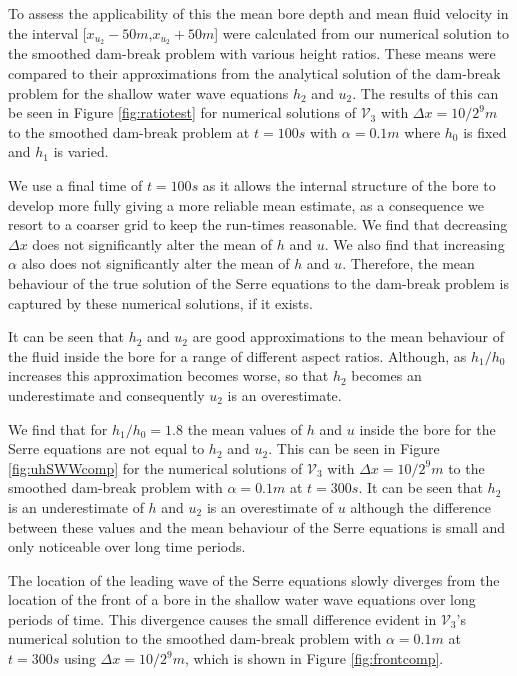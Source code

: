 \documentclass[times]{elsarticle}
\begin{document}
To assess the applicability of this the mean bore depth and mean fluid velocity in the interval [$x_{u_2}-50m$,$x_{u_2}+50m$] were calculated from our numerical solution to the smoothed dam-break problem with various height ratios. These means were compared to their approximations from the analytical solution of the dam-break problem for the shallow water wave equations $h_2$ and $u_2$. The results of this can be seen in Figure \ref{fig:ratiotest} for numerical solutions of $\mathcal{V}_3$ with $\Delta x = 10/2^{9}m$ to the smoothed dam-break problem at $t=100s$ with $\alpha = 0.1m$ where $h_0$ is fixed and $h_1$ is varied.

We use a final time of $t=100s$ as it allows the internal structure of the bore to develop more fully giving a more reliable mean estimate, as a consequence we resort to a coarser grid to keep the run-times reasonable. We find that decreasing $\Delta x$ does not significantly alter the mean of $h$ and $u$. We also find that increasing $\alpha$ also does not significantly alter the mean of $h$ and $u$. Therefore, the mean behaviour of the true solution of the Serre equations to the dam-break problem is captured by these numerical solutions, if it exists.

It can be seen that $h_2$ and $u_2$ are good approximations to the mean behaviour of the fluid inside the bore for a range of different aspect ratios. Although, as $h_1/h_0$ increases this approximation becomes worse, so that $h_2$ becomes an underestimate and consequently $u_2$ is an overestimate.

We find that for $h_1/h_0 = 1.8$ the mean values of $h$ and $u$ inside the bore for the Serre equations are not equal to $h_2$ and $u_2$. This can be seen in Figure \ref{fig:uhSWWcomp} for the numerical solutions of $\mathcal{V}_3$ with $\Delta x = 10/2^{9}m$ to the smoothed dam-break problem with $\alpha = 0.1m$ at $t=300s$. It can be seen that $h_2$ is an underestimate of $h$ and $u_2$ is an overestimate of $u$ although the difference between these values and the mean behaviour of the Serre equations is small and only noticeable over long time periods.

The location of the leading wave of the Serre equations slowly diverges from the location of the front of a bore in the shallow water wave equations over long periods of time. This divergence causes the small difference evident in $\mathcal{V}_3$'s numerical solution to the smoothed dam-break problem with $\alpha =0.1m$ at $t=300s$ using $\Delta x = 10/2^{9}m$, which is shown in Figure \ref{fig:frontcomp}.
\end{document}
